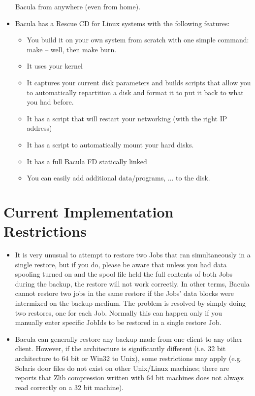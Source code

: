 \begin{itemize}
   Bacula from anywhere (even from home).
\item Bacula has a Rescue CD for Linux systems with the following features:  
   \begin{itemize}
   \item You build it on your own system from scratch with one simple  command:
      make -- well, then make burn. 
   \item It uses your kernel  
   \item It captures your current disk parameters and builds scripts that  allow
      you to automatically repartition a disk and format it to  put it back to what
      you had before. 
   \item It has a script that will restart your networking (with the right  IP
      address)  
   \item It has a script to automatically mount your hard disks.  
   \item It has a full Bacula FD statically linked  
   \item You can easily add additional data/programs, ... to the disk.  
   \end{itemize}

\end{itemize}

\section{Current Implementation Restrictions}

\begin{itemize}
\item It is very unusual to attempt to restore two Jobs
   that ran simultaneously in a single restore, but if
   you do, please be aware that unless you had
   data spooling turned on and the spool file held the full
   contents of both Jobs during the backup, the restore will not
   work correctly. In other terms, Bacula cannot restore
   two jobs in the same restore if the Jobs' data blocks were
   intermixed on the backup medium. The problem is resolved by
   simply doing two restores, one for each Job. 
   Normally this can happen only if you manually enter specific
   JobIds to be restored in a single restore Job.
\item Bacula can generally restore any backup made from one client
   to any other client. However, if the architecture is significantly
   different (i.e. 32 bit architecture to 64 bit or Win32 to Unix),
   some restrictions may apply (e.g. Solaris door files do not exist
   on other Unix/Linux machines; there are reports that Zlib compression
   written with 64 bit machines does not always read correctly on a 32 bit
   machine).
\end{itemize}

